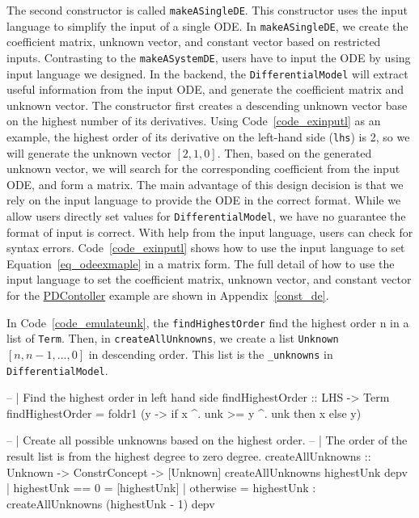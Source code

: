 The second constructor is called \verb|makeASingleDE|. This constructor uses the input language to simplify the input of a single ODE. In \verb|makeASingleDE|, we create the coefficient matrix, unknown vector, and constant vector based on restricted inputs. Contrasting to the \verb|makeASystemDE|, users have to input the ODE by using input language we designed. In the backend, the \verb|DifferentialModel| will extract useful information from the input ODE, and generate the coefficient matrix and unknown vector. The constructor first creates a descending unknown vector base on the highest number of its derivatives. Using Code~\ref{code_exinputl} as an example, the highest order of its derivative on the left-hand side (\verb|lhs|) is 2, so we will generate the unknown vector $[2, 1, 0]$. Then, based on the generated unknown vector, we will search for the corresponding coefficient from the input ODE, and form a matrix. The main advantage of this design decision is that we rely on the input language to provide the ODE in the correct format. While we allow users directly set values for \verb|DifferentialModel|, we have no guarantee the format of input is correct. With help from the input language, users can check for syntax errors. Code~\ref{code_exinputl} shows how to use the input language to set Equation~\ref{eq_odeexmaple} in a matrix form. The full detail of how to use the input language to set the coefficient matrix, unknown vector, and constant vector for the \href{https://jacquescarette.github.io/Drasil/examples/pdcontroller/SRS/srs/PDController_SRS.html}{PDContoller} example are shown in Appendix~\ref{const_de}.

In Code~\ref{code_emulateunk}, the \verb|findHighestOrder| find the highest order n in a list of \verb|Term|. Then, in \verb|createAllUnknowns|, we create a list \verb|Unknown| $[n, n-1, ..., 0]$ in descending order. This list is the \verb|_unknowns| in \verb|DifferentialModel|.

\begin{listing}[ht]
\begin{haskell1}
-- | Find the highest order in left hand side
findHighestOrder :: LHS -> Term
findHighestOrder = foldr1 (\x y -> if x ^. unk >= y ^. unk then x else y)

-- | Create all possible unknowns based on the highest order.
-- | The order of the result list is from the highest degree to zero degree.
createAllUnknowns :: Unknown -> ConstrConcept -> [Unknown]
createAllUnknowns highestUnk depv
  | highestUnk  == 0  = [highestUnk]
  | otherwise = highestUnk : createAllUnknowns (highestUnk - 1) depv
\end{haskell1}
\label{code_emulateunk}
\end{listing}

